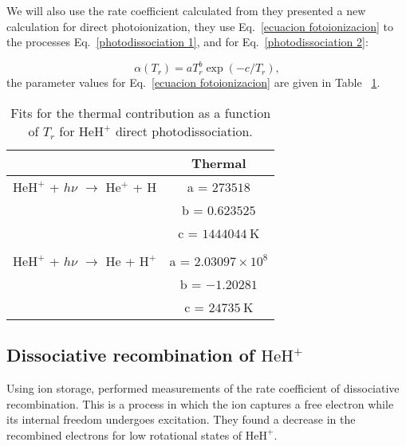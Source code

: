 \documentclass[baaa]{baaa}
\begin{document}
We will also use the rate coefficient calculated from \citet{Coppola2017} they presented a new calculation for direct photoionization, they use Eq.~\ref{ecuacion fotoionizacion} to the processes Eq.~\ref{photodissociation 1}, and for Eq.~\ref{photodissociation 2}:


\begin{equation} \label{ecuacion fotoionizacion}
\alpha({T_r})  =  a T_r^b \exp(-c/T_r),  
\end{equation}
the parameter values for Eq.~\ref{ecuacion fotoionizacion} are given in Table ~\ref{Parameters value of photodissociation}.

\begin{table}[h!]
    \caption{Fits for the thermal contribution as a function of $T_r$ for $\mathrm{HeH^+}$ direct photodissociation.}
    \label{Parameters value of photodissociation}
    \centering
    \begin{tabular}{lc} 
    \hline\hline\noalign{\smallskip}
            & Thermal \\ 
        \hline\noalign{\smallskip}
        $\mathrm{HeH^+}$ + $h\nu$ $\longrightarrow$ $\mathrm{He^+}$ + $\mathrm{H}$ &   a = $273518$ \\
        & b = $0.623525$ \\
        & c = $1444044~\mathrm{K}$\\
        & \\

        $\mathrm{HeH^+}$ + $h\nu$ $\longrightarrow$ $\mathrm{He}$ + $\mathrm{H^+}$ &   a = $2.03097 \times 10^8$ \\
        & b = $-1.20281$ \\
        & c = $24735~\mathrm{K}$ \\
        \hline

    \end{tabular}

\end{table}


\subsection{Dissociative recombination of $\mathrm{HeH^+}$}
Using ion storage, \citet{Novotny2019}  performed measurements of the rate coefficient of dissociative recombination. This is a process in which the ion captures a free electron while its internal freedom undergoes excitation. They found a decrease in the recombined electrons for low rotational states of $\mathrm{HeH^+}$.
\end{document}
